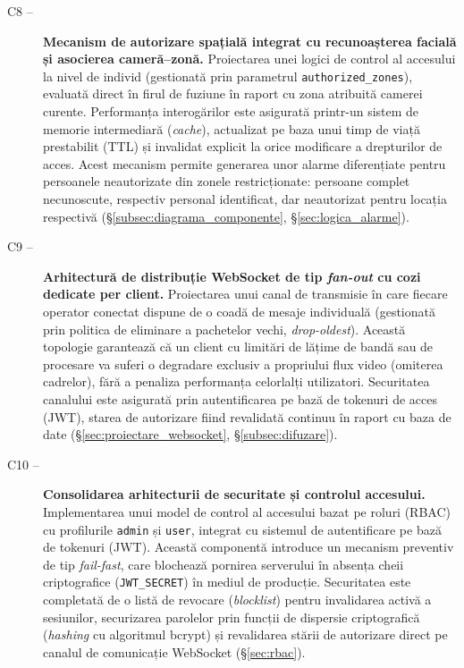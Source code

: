 \documentclass[../../main.tex]{subfiles}
\begin{document}
\begin{description}
	\item[C8 --] \textbf{Mecanism de autorizare spațială integrat cu recunoașterea facială și asocierea cameră--zonă.} Proiectarea unei logici de control al accesului la nivel de individ (gestionată prin parametrul \texttt{authorized\_zones}), evaluată direct în firul de fuziune în raport cu zona atribuită camerei curente. Performanța interogărilor este asigurată printr-un sistem de memorie intermediară (\textit{cache}), actualizat pe baza unui timp de viață prestabilit (TTL) și invalidat explicit la orice modificare a drepturilor de acces. Acest mecanism permite generarea unor alarme diferențiate pentru persoanele neautorizate din zonele restricționate: persoane complet necunoscute, respectiv personal identificat, dar neautorizat pentru locația respectivă (\S\ref{subsec:diagrama_componente}, \S\ref{sec:logica_alarme}).

	\item[C9 --] \textbf{Arhitectură de distribuție WebSocket de tip \textit{fan-out} cu cozi dedicate per client.} Proiectarea unui canal de transmisie în care fiecare operator conectat dispune de o coadă de mesaje individuală (gestionată prin politica de eliminare a pachetelor vechi, \textit{drop-oldest}). Această topologie garantează că un client cu limitări de lățime de bandă sau de procesare va suferi o degradare exclusiv a propriului flux video (omiterea cadrelor), fără a penaliza performanța celorlalți utilizatori. Securitatea canalului este asigurată prin autentificarea pe bază de tokenuri de acces (JWT), starea de autorizare fiind revalidată continuu în raport cu baza de date (\S\ref{sec:proiectare_websocket}, \S\ref{subsec:difuzare}).

	\item[C10 --] \textbf{Consolidarea arhitecturii de securitate și controlul accesului.} Implementarea unui model de control al accesului bazat pe roluri (RBAC) cu profilurile \texttt{admin} și \texttt{user}, integrat cu sistemul de autentificare pe bază de tokenuri (JWT). Această componentă introduce un mecanism preventiv de tip \textit{fail-fast}, care blochează pornirea serverului în absența cheii criptografice (\texttt{JWT\_SECRET}) în mediul de producție. Securitatea este completată de o listă de revocare (\textit{blocklist}) pentru invalidarea activă a sesiunilor, securizarea parolelor prin funcții de dispersie criptografică (\textit{hashing} cu algoritmul bcrypt) și revalidarea stării de autorizare direct pe canalul de comunicație WebSocket (\S\ref{sec:rbac}).


\end{description}
\end{document}
